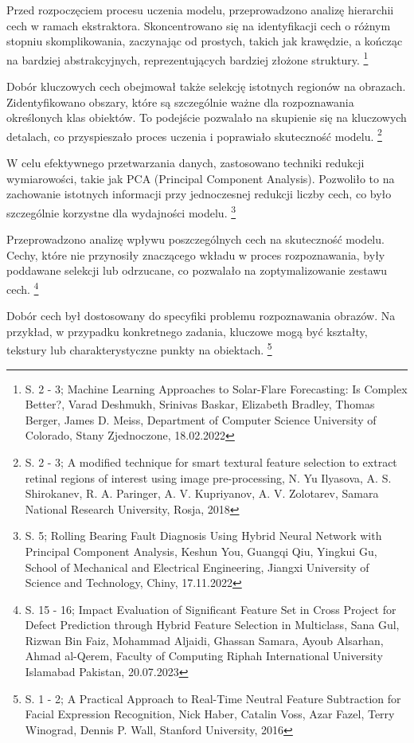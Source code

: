 \documentclass[12pt, a4paper, twoside, openany]{book}
\begin{document}
Przed rozpoczęciem procesu uczenia modelu, przeprowadzono analizę hierarchii cech w ramach ekstraktora.
Skoncentrowano się na identyfikacji cech o różnym stopniu skomplikowania, zaczynając od prostych, takich jak krawędzie, a kończąc na bardziej abstrakcyjnych, reprezentujących bardziej złożone struktury. \footnote{ S. 2 - 3; Machine Learning Approaches to Solar-Flare Forecasting: Is Complex Better?, Varad Deshmukh, Srinivas Baskar, Elizabeth Bradley, Thomas Berger, James D. Meiss, Department of Computer Science University of Colorado, Stany Zjednoczone, 18.02.2022}

Dobór kluczowych cech obejmował także selekcję istotnych regionów na obrazach.
Zidentyfikowano obszary, które są szczególnie ważne dla rozpoznawania określonych klas obiektów.
To podejście pozwalało na skupienie się na kluczowych detalach, co przyspieszało proces uczenia i poprawiało skuteczność modelu. \footnote{ S. 2 - 3; A modified technique for smart textural feature selection to extract retinal regions of interest using image pre-processing, N. Yu Ilyasova, A. S. Shirokanev, R. A. Paringer, A. V. Kupriyanov, A. V. Zolotarev, Samara National Research University, Rosja, 2018}

W celu efektywnego przetwarzania danych, zastosowano techniki redukcji wymiarowości, takie jak PCA (Principal Component Analysis).
Pozwoliło to na zachowanie istotnych informacji przy jednoczesnej redukcji liczby cech, co było szczególnie korzystne dla wydajności modelu. \footnote{ S. 5; Rolling Bearing Fault Diagnosis Using Hybrid Neural Network with Principal Component Analysis, Keshun You, Guangqi Qiu, Yingkui Gu, School of Mechanical and Electrical Engineering, Jiangxi University of Science and Technology, Chiny, 17.11.2022}

Przeprowadzono analizę wpływu poszczególnych cech na skuteczność modelu.
Cechy, które nie przynosiły znaczącego wkładu w proces rozpoznawania, były poddawane selekcji lub odrzucane, co pozwalało na zoptymalizowanie zestawu cech. \footnote{ S. 15 - 16; Impact Evaluation of Significant Feature Set in Cross Project for Defect Prediction through Hybrid Feature Selection in Multiclass, Sana Gul, Rizwan Bin Faiz, Mohammad Aljaidi, Ghassan Samara, Ayoub Alsarhan, Ahmad al-Qerem, Faculty of Computing Riphah International University Islamabad Pakistan, 20.07.2023}

Dobór cech był dostosowany do specyfiki problemu rozpoznawania obrazów.
Na przykład, w przypadku konkretnego zadania, kluczowe mogą być kształty, tekstury lub charakterystyczne punkty na obiektach. \footnote{ S. 1 - 2; A Practical Approach to Real-Time Neutral Feature Subtraction for Facial Expression Recognition, Nick Haber, Catalin Voss, Azar Fazel, Terry Winograd, Dennis P. Wall, Stanford University, 2016}
\end{document}
